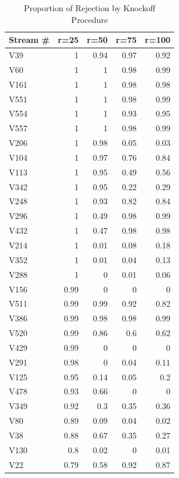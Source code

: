 \documentclass[a4paper,12pt]{article}
\begin{document}
\begin{table}[htbp]
  \centering
  \caption{Proportion of Rejection by Knockoff Procedure}
    \begin{tabular}{lrrrr}
    \midrule
    Stream \# & \multicolumn{1}{r}{r=25} & \multicolumn{1}{r}{r=50} & \multicolumn{1}{r}{r=75} & \multicolumn{1}{r}{r=100} \\
      \midrule
    V39 & 1 & 0.94 & 0.97 & 0.92 \\
    V60 & 1 & 1 & 0.98 & 0.99 \\
    V161 & 1 & 1 & 0.98 & 0.98 \\
    V551 & 1 & 1 & 0.98 & 0.99 \\
    V554 & 1 & 1 & 0.93 & 0.95 \\
    V557 & 1 & 1 & 0.98 & 0.99 \\
    V206 & 1 & 0.98 & 0.05 & 0.03 \\
    V104 & 1 & 0.97 & 0.76 & 0.84 \\
    V113 & 1 & 0.95 & 0.49 & 0.56 \\
    V342 & 1 & 0.95 & 0.22 & 0.29 \\
    V248 & 1 & 0.93 & 0.82 & 0.84 \\
    V296 & 1 & 0.49 & 0.98 & 0.99 \\
    V432 & 1 & 0.47 & 0.98 & 0.98 \\
    V214 & 1 & 0.01 & 0.08 & 0.18 \\
    V352 & 1 & 0.01 & 0.04 & 0.13 \\
    V288 & 1 & 0 & 0.01 & 0.06 \\
    V156 & 0.99 & 0 & 0 & 0 \\
    V511 & 0.99 & 0.99 & 0.92 & 0.82 \\
    V386 & 0.99 & 0.98 & 0.98 & 0.99 \\
    V520 & 0.99 & 0.86 & 0.6 & 0.62 \\
    V429 & 0.99 & 0 & 0 & 0 \\
    V291 & 0.98 & 0 & 0.04 & 0.11 \\
    V125 & 0.95 & 0.14 & 0.05 & 0.2 \\
    V478 & 0.93 & 0.66 & 0 & 0 \\
    V349 & 0.92 & 0.3 & 0.35 & 0.36 \\
    V80 & 0.89 & 0.09 & 0.04 & 0.02 \\
    V38 & 0.88 & 0.67 & 0.35 & 0.27 \\
    V130 & 0.8 & 0.02 & 0 & 0.01 \\
    V22 & 0.79 & 0.58 & 0.92 & 0.87 \\

\end{tabular}
\end{table}
\end{document}
